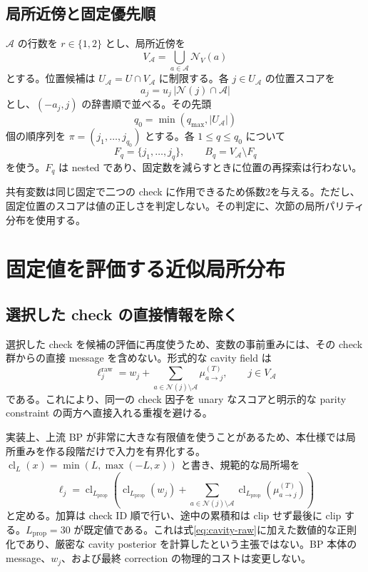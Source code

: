 \documentclass[a4paper,11pt]{ltjsarticle}
\numberwithin{equation}{section}
\theoremstyle{definition}
\newcommand{\N}{\mathcal N}
\newcommand{\A}{\mathcal A}
\begin{document}
\subsection{局所近傍と固定優先順}
$\A$ の行数を $r\in\{1,2\}$ とし、局所近傍を
\begin{equation}
 V_\A=\bigcup_{a\in\A}\N_V(a)
 \label{eq:region}
\end{equation}
とする。位置候補は $U_\A=U\cap V_\A$ に制限する。各 $j\in U_\A$ の位置スコアを
\begin{equation}
 a_j=u_j\,|\N(j)\cap\A|
 \label{eq:position-score}
\end{equation}
とし、$(-a_j,j)$ の辞書順で並べる。その先頭
\begin{equation}
 q_0=\min(q_{\max},|U_\A|)
\end{equation}
個の順序列を $\pi=(j_1,\ldots,j_{q_0})$ とする。各 $1\le q\le q_0$ について
\begin{equation}
 F_q=\{j_1,\ldots,j_q\},\qquad B_q=V_\A\setminus F_q
 \label{eq:nested}
\end{equation}
を使う。$F_q$ は nested であり、固定数を減らすときに位置の再探索は行わない。

共有変数は同じ固定で二つの check に作用できるため係数2を与える。ただし、固定位置のスコアは値の正しさを判定しない。その判定に、次節の局所パリティ分布を使用する。

\section{固定値を評価する近似局所分布}
\subsection{選択した check の直接情報を除く}
選択した check を候補の評価に再度使うため、変数の事前重みには、その check 群からの直接 message を含めない。形式的な cavity field は
\begin{equation}
 \ell_j^{\mathrm{raw}}=w_j+
       \sum_{a\in\N(j)\setminus\A}\mu_{a\to j}^{(T)},
 \qquad j\in V_\A
 \label{eq:cavity-raw}
\end{equation}
である。これにより、同一の check 因子を unary なスコアと明示的な parity constraint の両方へ直接入れる重複を避ける。

実装上、上流 BP が非常に大きな有限値を使うことがあるため、本仕様では局所重みを作る段階だけで入力を有界化する。$\operatorname{cl}_L(x)=\min(L,\max(-L,x))$ と書き、規範的な局所場を
\begin{equation}
 \ell_j=\operatorname{cl}_{L_{\mathrm{prop}}}\!\left(
     \operatorname{cl}_{L_{\mathrm{prop}}}(w_j)+
     \sum_{a\in\N(j)\setminus\A}
           \operatorname{cl}_{L_{\mathrm{prop}}}(\mu_{a\to j}^{(T)})
                    \right)
 \label{eq:cavity}
\end{equation}
と定める。加算は check ID 順で行い、途中の累積和は clip せず最後に clip する。$L_{\mathrm{prop}}=30$ が既定値である。これは式\eqref{eq:cavity-raw}に加えた数値的な正則化であり、厳密な cavity posterior を計算したという主張ではない。BP 本体の message、$w_j$、および最終 correction の物理的コストは変更しない。
\end{document}
